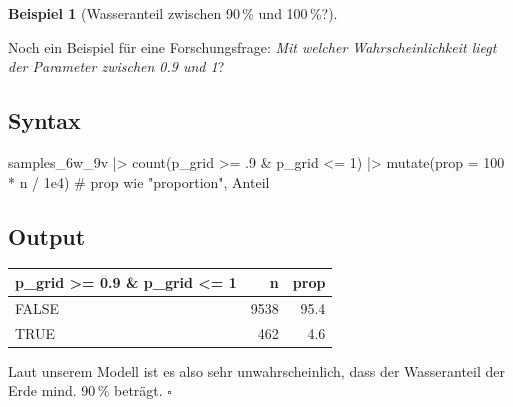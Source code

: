 \documentclass[
  ngerman,
  letterpaper,
  twoside,
  open=any]{scrbook}
\newenvironment{Shaded}{\begin{snugshade}}{\end{snugshade}}
\newcommand{\AttributeTok}[1]{\textcolor[rgb]{0.40,0.45,0.13}{#1}}
\newcommand{\CommentTok}[1]{\textcolor[rgb]{0.37,0.37,0.37}{#1}}
\newcommand{\DecValTok}[1]{\textcolor[rgb]{0.68,0.00,0.00}{#1}}
\newcommand{\FloatTok}[1]{\textcolor[rgb]{0.68,0.00,0.00}{#1}}
\newcommand{\FunctionTok}[1]{\textcolor[rgb]{0.28,0.35,0.67}{#1}}
\newcommand{\NormalTok}[1]{\textcolor[rgb]{0.00,0.23,0.31}{#1}}
\newcommand{\SpecialCharTok}[1]{\textcolor[rgb]{0.37,0.37,0.37}{#1}}
\newcounter{none} %
\theoremstyle{definition}
\newtheorem{example}{Beispiel}[chapter]
\theoremstyle{plain}
\theoremstyle{definition}
\theoremstyle{definition}
\theoremstyle{definition}
\newtheorem{example}{Beispiel}[chapter]
\theoremstyle{definition}
\theoremstyle{remark}
\begin{document}
\begin{example}[Wasseranteil zwischen 90\,\% und
100\,\%?]\protect\hypertarget{exm-param3}{}\label{exm-param3}

Noch ein Beispiel für eine Forschungsfrage: \emph{Mit welcher
Wahrscheinlichkeit liegt der Parameter zwischen 0.9 und 1}?

\subsection{Syntax}

\begin{Shaded}
\begin{Highlighting}[]
\NormalTok{samples\_6w\_9v }\SpecialCharTok{|\textgreater{}}
  \FunctionTok{count}\NormalTok{(p\_grid }\SpecialCharTok{\textgreater{}=}\NormalTok{ .}\DecValTok{9} \SpecialCharTok{\&}\NormalTok{ p\_grid }\SpecialCharTok{\textless{}=} \DecValTok{1}\NormalTok{) }\SpecialCharTok{|\textgreater{}}
  \FunctionTok{mutate}\NormalTok{(}\AttributeTok{prop =} \DecValTok{100} \SpecialCharTok{*}\NormalTok{ n }\SpecialCharTok{/} \FloatTok{1e4}\NormalTok{)  }\CommentTok{\# prop wie "proportion", Anteil}
\end{Highlighting}
\end{Shaded}

\subsection{Output}

{\def\LTcaptype{none} %
\begin{longtable}[]{@{}lrr@{}}
\toprule\noalign{}
p\_grid \textgreater= 0.9 \& p\_grid \textless= 1 & n & prop \\
\midrule\noalign{}
\endhead
\bottomrule\noalign{}
\endlastfoot
FALSE & 9538 & 95.4 \\
TRUE & 462 & 4.6 \\
\end{longtable}
}

Laut unserem Modell ist es also sehr unwahrscheinlich, dass der
Wasseranteil der Erde mind. 90\,\% beträgt. \(\square\)

\end{example}
\end{document}

